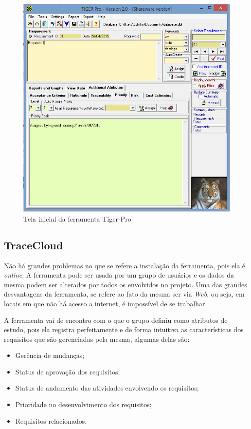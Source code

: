 \begin{figure}[!htb]
\centering
\includegraphics[scale=0.4]{figuras/tiger-pro.png}
\caption{Tela inicial da ferramenta Tiger-Pro}
\end{figure}

\subsection{TraceCloud}
Não há grandes problemas no que se refere a instalação da ferramenta, pois ela é \textit{online}. A ferramenta pode ser usada por um grupo de usuários e os dados da mesma podem ser alterados por todos os envolvidos no projeto. Uma das grandes desvantagens da ferramenta, se refere ao fato da mesma ser via \textit{Web}, ou seja, em locais em que não há acesso a internet, é impossível de se trabalhar.

A ferramenta vai de encontro com o que o grupo definiu como atributos de estudo, pois ela registra perfeitamente e de forma intuitiva as características dos requisitos que são gerenciadas pela mesma, algumas delas são:
\begin{itemize}
  \item Gerência de mudanças;
  \item Status de aprovação dos requisitos;
  \item Status de andamento das atividades envolvendo os requisitos;
  \item Prioridade no desenvolvimento dos requisitos;
  \item Requisitos relacionados.
\end{itemize}

